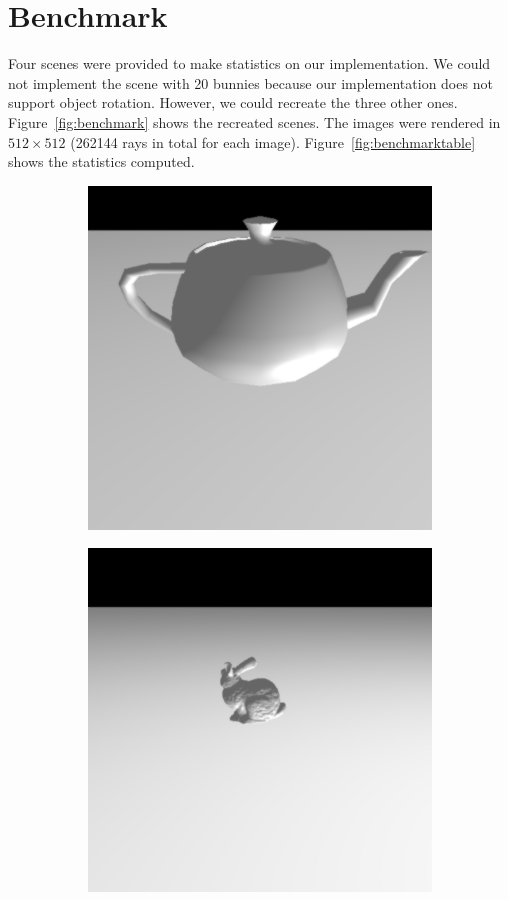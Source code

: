 \documentclass[acmsmall]{acmart}
\begin{document}
\section{Benchmark}

Four scenes were provided to make statistics on our implementation. We could not implement the scene with 20 bunnies because our implementation does not support object rotation.
However, we could recreate the three other ones. Figure~\ref{fig:benchmark} shows the recreated scenes. The images were rendered in $512\times512$ (262144 rays in total for each image).
Figure~\ref{fig:benchmarktable} shows the statistics computed.

\begin{figure}[h]
    \centering
    
\begin{subfigure}{.3\textwidth}
  \centering
  \includegraphics[width=.9\linewidth]{img/benchmarkteapot.png}
\end{subfigure}%
\begin{subfigure}{.3\textwidth}
  \centering
  \includegraphics[width=.9\linewidth]{img/benchmarkbunny.png}

\end{subfigure}
\end{figure}
\end{document}
